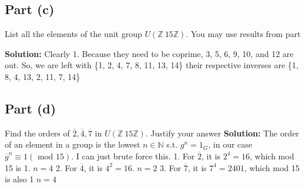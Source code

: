 \documentclass{article}
\begin{document}
\subsection{Part (c)}
List all the elements of the unit group $U(\mathbb{Z}\ 15\mathbb{Z})$. You may use results from part

\noindent \textbf{Solution:} 
Clearly 1. Because they need to be coprime, 3, 5, 6, 9, 10, and 12 are out. So, we are left with
\{1, 2, 4, 7, 8, 11, 13, 14\} their respective inverses are \{1, 8, 4, 13, 2, 11, 7, 14\}

\subsection{Part (d)}
Find the orders of $\overline{2}, \overline{4}, \overline{7}$ in $U(\mathbb{Z}\ 15\mathbb{Z})$. Justify your answer
\noindent \textbf{Solution:} 
The order of an element in a group is the lowest $n \in \mathbb{N}$ s.t. $g^n=1_G$, in our case $\overline{g}^n \equiv 1(\textrm{ mod } 15)$. I can just brute force this.
1. For $\overline{2}$, it is $2^4=16$, which mod 15 is 1. $n=4$
2. For $\overline{4}$, it is $4^2=16$. $n=2$
3. For $\overline{7}$, it is $7^4=2401$, which mod 15 is also 1 $n=4$
\end{document}
